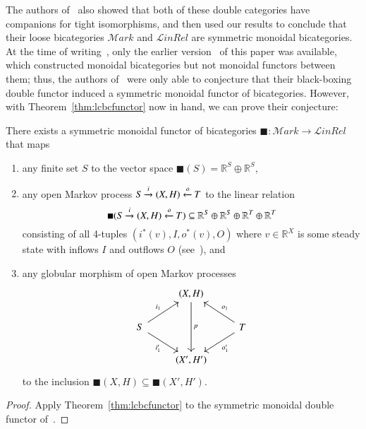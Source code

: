 The authors of~\cite{bc:markov} also showed that both of these double categories have companions for tight isomorphisms, and then used our results to conclude that their loose bicategories $\mathcal{M}\mathit{ark}$ and $\mathcal{L}\mathit{inRel}$ are symmetric monoidal bicategories.
At the time of writing~\cite{bc:markov}, only the earlier version~\cite{shulman:smbicat} of this paper was available, which constructed monoidal bicategories but not monoidal functors between them; thus, the authors of~\cite{bc:markov} were only able to conjecture that their black-boxing double functor induced a symmetric monoidal functor of bicategories.
However, with Theorem~\ref{thm:lcbcfunctor} now in hand, we can prove their conjecture:

\begin{thm}
  There exists a symmetric monoidal functor of bicategories $\blacksquare : \mathcal{M}\mathit{ark} \to \mathcal{L}\mathit{inRel}$ that maps
  \begin{enumerate}
  \item any finite set $S$ to the vector space $\blacksquare(S) = \mathbb{R}^S \oplus \mathbb{R}^S$,
  \item any open Markov process $S \xrightarrow{i} (X,H) \xleftarrow{o} T$ to the linear relation
    \[ \blacksquare(S \xrightarrow{i} (X,H) \xleftarrow{o} T) \subseteq \mathbb{R}^S\oplus \mathbb{R}^S\oplus \mathbb{R}^T\oplus \mathbb{R}^T \]
    consisting of all 4-tuples $(i^*(v),I,o^*(v),O)$ where $v\in \mathbb{R}^X$ is some steady state with inflows $I$ and outflows $O$ (see~\cite[Definition 2.7]{bc:markov}), and
  \item any globular morphism of open Markov processes
    \[
      \begin{tikzcd}
        & {(X,H)} \arrow[dd, "p"] &  \\
        S \arrow[ru, "i_1"] \arrow[rd, "i_1'"'] &  & T \arrow[lu, "o_1"'] \arrow[ld, "o_1'"] \\
        & {(X',H')} & 
      \end{tikzcd}
    \]
    to the inclusion $\blacksquare(X,H) \subseteq \blacksquare(X',H')$.
  \end{enumerate}
\end{thm}
\begin{proof}
  Apply Theorem~\ref{thm:lcbcfunctor} to the symmetric monoidal double functor of~\cite[Theorem 5.5]{bc:markov}.
\end{proof}


